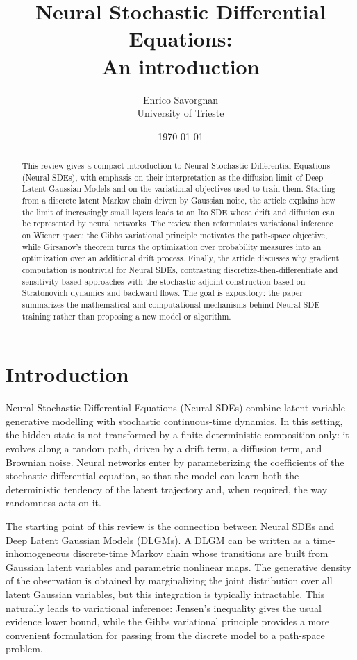 \documentclass[11pt]{article}
\begin{document}
\title{Neural Stochastic Differential Equations: \\An introduction}
\author{Enrico Savorgnan\\\scriptsize University of Trieste}
\date{\today}

\maketitle

\begin{abstract}
This review gives a compact introduction to Neural Stochastic Differential Equations (Neural SDEs), with emphasis on their interpretation as the diffusion limit of Deep Latent Gaussian Models and on the variational objectives used to train them. Starting from a discrete latent Markov chain driven by Gaussian noise, the article explains how the limit of increasingly small layers leads to an Ito SDE whose drift and diffusion can be represented by neural networks. The review then reformulates variational inference on Wiener space: the Gibbs variational principle motivates the path-space objective, while Girsanov's theorem turns the optimization over probability measures into an optimization over an additional drift process. Finally, the article discusses why gradient computation is nontrivial for Neural SDEs, contrasting discretize-then-differentiate and sensitivity-based approaches with the stochastic adjoint construction based on Stratonovich dynamics and backward flows. The goal is expository: the paper summarizes the mathematical and computational mechanisms behind Neural SDE training rather than proposing a new model or algorithm.
\end{abstract}

\section{Introduction}
\label{sec:intro}
Neural Stochastic Differential Equations (Neural SDEs) combine latent-variable generative modelling with stochastic continuous-time dynamics. In this setting, the hidden state is not transformed by a finite deterministic composition only: it evolves along a random path, driven by a drift term, a diffusion term, and Brownian noise. Neural networks enter by parameterizing the coefficients of the stochastic differential equation, so that the model can learn both the deterministic tendency of the latent trajectory and, when required, the way randomness acts on it.

The starting point of this review is the connection between Neural SDEs and Deep Latent Gaussian Models (DLGMs). A DLGM can be written as a time-inhomogeneous discrete-time Markov chain whose transitions are built from Gaussian latent variables and parametric nonlinear maps. The generative density of the observation is obtained by marginalizing the joint distribution over all latent Gaussian variables, but this integration is typically intractable. This naturally leads to variational inference: Jensen's inequality gives the usual evidence lower bound, while the Gibbs variational principle provides a more convenient formulation for passing from the discrete model to a path-space problem.
\end{document}
